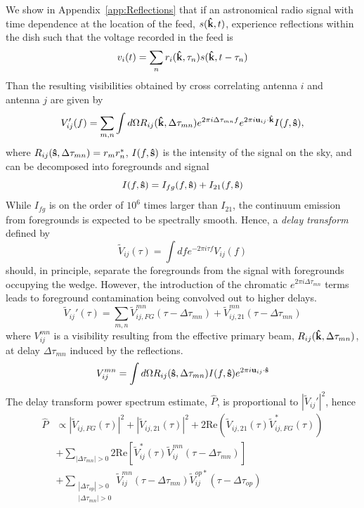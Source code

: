 \documentclass[preprint]{emulateapj}
\begin{document}
 We show in Appendix~\ref{app:Reflections} that if an astronomical radio signal with time dependence at the location of the feed, $s({\bf \hat{k}},t)$, experience reflections within the dish such that the voltage recorded in the feed is 
\begin{equation}
v_i(t) = \sum_n r_i({\bf \hat{k}},\tau_n) s({\bf \hat{k}},t - \tau_n)
\end{equation}
Than the resulting visibilities obtained by cross correlating antenna $i$ and antenna $j$ are given by 
\begin{equation}
V'_{ij}(f) = \sum_{m,n} \int d \Omega R_{ij}({\bf \hat{k}},\Delta \tau_{mn}) e^{2 \pi i \Delta \tau_{mn}f} e^{2 \pi i {\bf u}_{ij} \cdot {\bf \hat{k}}} I(f,{\bf \hat{s}}),
\end{equation}
where $R_{ij}({\bf \hat{s}},\Delta \tau_{mn})=r_m r_n^*$, $I(f,{\bf \hat{s}})$ is the intensity of the signal on the sky, and can be decomposed into foregrounds and signal
\begin{equation}
I(f,{\bf \hat{s}}) = I_{fg}(f,{\bf \hat{s}})+I_{21}(f,{\bf \hat{s}})
\end{equation}
While $I_{fg}$ is on the order of $10^6$ times larger than $I_{21}$, the continuum emission from foregrounds is expected to be spectrally smooth. Hence, a {\it delay transform} defined by
\begin{equation}
\widetilde{V}_{ij}(\tau) = \int d f e^{-2 \pi i \tau f} V_{ij}(f)
\end{equation}
should, in principle, separate the foregrounds from the signal with foregrounds occupying the wedge. However, the introduction of the chromatic $e^{2 \pi i \Delta \tau_{mn}}$ terms leads to foreground contamination being convolved out to higher delays.
\begin{equation}
\widetilde{V}_{ij}'(\tau) = \sum_{m,n} \widetilde{V}_{ij,FG}^{mn}(\tau - \Delta \tau_{mn}) + \widetilde{V}_{ij,21}^{mn}(\tau - \Delta \tau_{mn})
\end{equation}
where $V_{ij}^{mn}$ is a visibility resulting from the effective primary beam, $R_{ij}({\bf \hat{k}},\Delta \tau_{mn})$, at delay $\Delta \tau_{mn}$ induced by the reflections.
\begin{equation}
V_{ij}^{mn} = \int d \Omega R_{ij}({\bf \hat{s}},\Delta \tau_{mn}) I(f,{\bf \hat{s}})e^{2 \pi i {\bf u}_{ij} \cdot {\bf \hat{s}}}
\end{equation}
The delay transform power spectrum estimate, $\widehat{P}$, is proportional to $|\widetilde{V}_{ij}'|^2$, hence 
\begin{align}\label{eq:Reflections}
\widehat{P} & \propto |\widetilde{V}_{ij,FG}(\tau)|^2 + |\widetilde{V}_{ij,21}(\tau)|^2 + 2 \text{Re}(\widetilde{V}_{ij,21}(\tau)\widetilde{V}_{ij,FG}^*(\tau)) \nonumber \\
&+ \sum_{|\Delta \tau_{mn}| > 0} 2 \text{Re} \left[   \widetilde{V}^*_{ij} (\tau) \widetilde{V}^{mn}_{ij} (\tau - \Delta \tau_{mn})  \right] \nonumber \\
&+ \sum_{\substack{|\Delta \tau_{op}|>0\\|\Delta \tau_{mn}|>0}} \widetilde{V}^{mn}_{ij} (\tau - \Delta \tau_{mn}) \widetilde{V}^{op*}_{ij}(\tau - \Delta \tau_{op})
\end{align}
\end{document}
